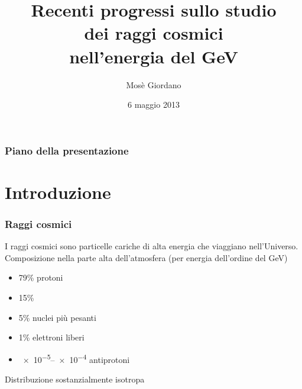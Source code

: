 \documentclass[10pt]{beamer}
\title[Recenti progressi sullo studio dei raggi cosmici (GeV)]{Recenti progressi
  sullo studio \\ dei raggi cosmici \\ nell'energia del GeV}
\author{Mosè Giordano}
\date{6 maggio 2013}
\institute{Università del Salento}
\begin{document}
\begin{frame}
  \maketitle
\end{frame}

\begin{frame}
  \frametitle{Piano della presentazione}
  \tableofcontents
\end{frame}

\section{Introduzione}


\begin{frame}
  \frametitle{Raggi cosmici}
  I \alert{raggi cosmici} sono \alert{particelle cariche di alta energia} che
  viaggiano nell'Universo.  Composizione nella parte alta dell'atmosfera (per
  energia dell'ordine del \si{\giga\electronvolt})
  \begin{itemize}
  \item 79\% protoni
  \item 15\% \PGa
  \item 5\% nuclei più pesanti
  \item 1\% elettroni liberi
  \item \numrange[range-phrase=--]{e-5}{e-4} antiprotoni
  \end{itemize}
  Distribuzione sostanzialmente isotropa
\end{frame}
\end{document}
